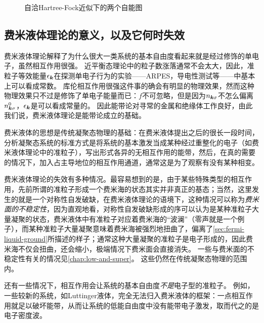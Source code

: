 \begin{figure}
    \centering
    
    \caption{自洽Hartree-Fock近似下的两个自能图}
    \label{fig:scf-fermi-liquid}
\end{figure}

\subsection{费米液体理论的意义，以及它何时失效}

费米液体理论解释了为什么很大一类系统的基本自由度看起来就是经过修饰的单电子，虽然相互作用很强。
近平衡态理论中的粒子数涨落通常不会太大，因此，准粒子等效能量$\epsilon_{\vb*{k}}$在探测单电子行为的实验——ARPES，导电性测试等——中基本上可以看成常数。
库伦相互作用很强这件事的确会有明显的物理效果，然而这种物理效果只不过是修饰了单电子能量而已：$f$不可忽略，但是因为$n_{\vb*{k} \sigma}$不怎么偏离$n^0_{\vb*{k} \sigma}$，$\epsilon_{\vb*{k}}$是可以看成常量的。
因此能带论对寻常的金属和绝缘体工作良好，由此我们说，费米液体理论是能带论成立的基础。

费米液体的思想是传统凝聚态物理的基础：在费米液体提出之后的很长一段时间，分析凝聚态系统的标准方式是将系统的基本激发当成某种经过重整化的电子（如费米液体理论中的准粒子），写出形式各异的无相互作用的能带，然后，在真的需要的情况下，加入占主导地位的相互作用通道，通常这是为了观察有没有某种相变。

费米液体理论的失效有多种情况。最容易想到的是，由于某些特殊类型的相互作用，先前所谓的准粒子形成一个费米海的状态其实并非真正的基态；当然，这里发生的就是一个对称性自发破缺，在费米液体理论的语境下，这种情况可以称为\emph{费米面的不稳定性}，因为直观地看，对称性自发破缺形成的序可以认为是某种准粒子大量凝聚的状态，费米液体中有准粒子对应着费米海的“波澜”（零声就是一个例子），而某种准粒子大量凝聚意味着费米海被强烈地扭曲了，偏离了\autoref{sec:fermi-liquid-ground}所描述的样子；通常这种大量凝聚的准粒子是电子形成的，因此费米海不仅会扭曲，还会缩小，极端情况下费米面会直接消失。
一些与费米面的不稳定性有关的情况见\autoref{chap:low-and-super}。
这些仍然在传统凝聚态物理的范围内。

还有一些情况下，相互作用会让系统的基本自由度\emph{不是}电子型的准粒子。
例如，一些较新的系统，如Luttinger液体，完全无法归入费米液体的框架：一点相互作用就足以破坏能带，从而让系统的低能自由度中没有能带电子激发，取而代之的是电子密度波。
